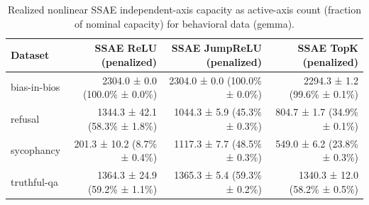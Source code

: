 \begin{table}[t]
\centering
\caption{Realized nonlinear SSAE independent-axis capacity as active-axis count (fraction of nominal capacity) for behavioral data (gemma).}
\label{tab:behavioral-gemma-realized-active-axis-capacity}
\begin{tabular}{lrrr}
\toprule
Dataset & SSAE ReLU (penalized) & SSAE JumpReLU (penalized) & SSAE TopK (penalized) \\
\midrule
bias-in-bios & 2304.0 ± 0.0 (100.0\% ± 0.0\%) & 2304.0 ± 0.0 (100.0\% ± 0.0\%) & 2294.3 ± 1.2 (99.6\% ± 0.1\%) \\
refusal & 1344.3 ± 42.1 (58.3\% ± 1.8\%) & 1044.3 ± 5.9 (45.3\% ± 0.3\%) & 804.7 ± 1.7 (34.9\% ± 0.1\%) \\
sycophancy & 201.3 ± 10.2 (8.7\% ± 0.4\%) & 1117.3 ± 7.7 (48.5\% ± 0.3\%) & 549.0 ± 6.2 (23.8\% ± 0.3\%) \\
truthful-qa & 1364.3 ± 24.9 (59.2\% ± 1.1\%) & 1365.3 ± 5.4 (59.3\% ± 0.2\%) & 1340.3 ± 12.0 (58.2\% ± 0.5\%) \\
\bottomrule
\end{tabular}
\end{table}
